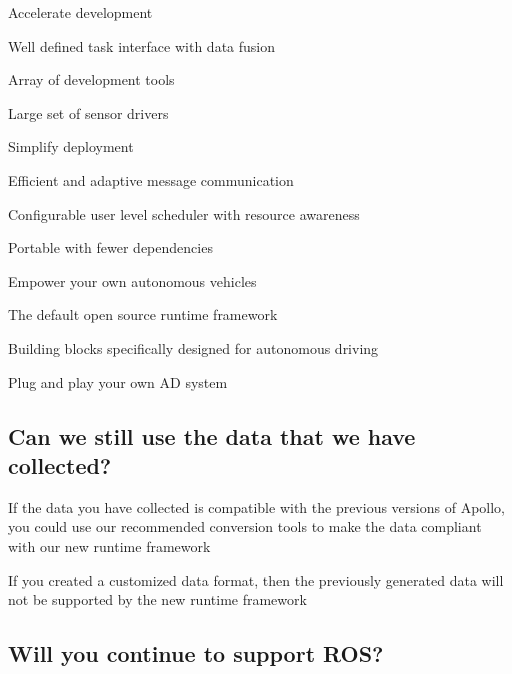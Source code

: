 \begin{DoxyItemize}
\item Accelerate development
\begin{DoxyItemize}
\item Well defined task interface with data fusion
\item Array of development tools
\item Large set of sensor drivers
\end{DoxyItemize}
\item Simplify deployment
\begin{DoxyItemize}
\item Efficient and adaptive message communication
\item Configurable user level scheduler with resource awareness
\item Portable with fewer dependencies
\end{DoxyItemize}
\item Empower your own autonomous vehicles
\begin{DoxyItemize}
\item The default open source runtime framework
\item Building blocks specifically designed for autonomous driving
\item Plug and play your own A\-D system 


\end{DoxyItemize}
\end{DoxyItemize}

\subsection*{Can we still use the data that we have collected?}


\begin{DoxyItemize}
\item If the data you have collected is compatible with the previous versions of Apollo, you could use our recommended conversion tools to make the data compliant with our new runtime framework
\item If you created a customized data format, then the previously generated data will not be supported by the new runtime framework 


\end{DoxyItemize}

\subsection*{Will you continue to support R\-O\-S?}

